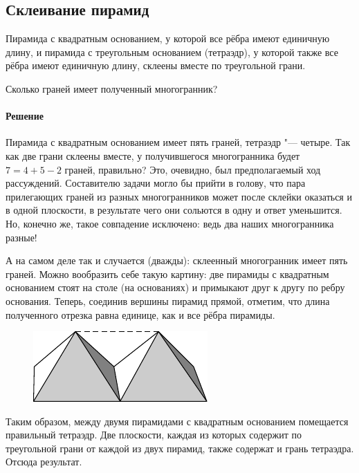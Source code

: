 \documentclass[twoside]{book}
\makeatletter
\newcommand{\rindex}[2][\imki@jobname]{%
\index[#1]{\detokenize{#2}}%
}
\makeatother
\begin{document}
\subsection*{Склеивание пирамид}%
\rindex{Склеивание пирамид}

Пирамида с квадратным основанием, у которой все рёбра имеют единичную длину, и пирамида с треугольным основанием (тетраэдр), у которой также все рёбра имеют единичную длину, склеены вместе по треугольной грани.

Сколько граней имеет полученный многогранник?

\paragraph{Решение}

Пирамида с квадратным основанием имеет пять граней, тетраэдр "--- четыре.
Так как две грани склеены вместе, у получившегося многогранника будет $7=4+5-2$ граней, правильно?
Это, очевидно, был предполагаемый ход рассуждений.
Составителю задачи могло бы прийти в голову, что  пара прилегающих
граней из разных многогранников может после склейки оказаться и в
одной плоскости, в результате чего они сольются в одну и ответ уменьшится.
Но, конечно же, такое совпадение исключено:
ведь два наших многогранника разные!

А на самом деле так и случается (дважды):
склеенный многогранник имеет пять граней.
Можно вообразить себе такую картину: две пирамиды с квадратным
основанием стоят на столе (на основаниях)
и примыкают друг к другу по ребру основания.
Теперь, соединив вершины пирамид прямой, отметим, что длина полученного отрезка равна единице, как и все рёбра пи\-ра\-миды. 

\begin{figure}[!ht]
\vspace{-\jot}
\centering
\includegraphics{mp/wink-6}

\end{figure}

Таким образом, между двумя пирамидами с квадратным основанием помещается правильный тетраэдр.
Две плоскости, каждая из которых содержит по треугольной грани от каждой из двух пирамид, также содержат и грань тетраэдра.
Отсюда результат. 
\heart
\end{document}
